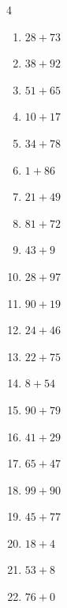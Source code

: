 \begin{multicols}{4}
\begin{enumerate}
  \item $28+73$
        \phantom{$=101$}

  \item $38+92$
        \phantom{$=130$}

  \item $51+65$
        \phantom{$=116$}

  \item $10+17$
        \phantom{$=27$}

  \item $34+78$
        \phantom{$=112$}

  \item $1+86$
        \phantom{$=87$}

  \item $21+49$
        \phantom{$=70$}

  \item $81+72$
        \phantom{$=153$}

  \item $43+9$
        \phantom{$=52$}

  \item $28+97$
        \phantom{$=125$}

  \item $90+19$
        \phantom{$=109$}

  \item $24+46$
        \phantom{$=70$}

  \item $22+75$
        \phantom{$=97$}

  \item $8+54$
        \phantom{$=62$}

  \item $90+79$
        \phantom{$=169$}

  \item $41+29$
        \phantom{$=70$}

  \item $65+47$
        \phantom{$=112$}

  \item $99+90$
        \phantom{$=189$}

  \item $45+77$
        \phantom{$=122$}

  \item $18+4$
        \phantom{$=22$}

  \item $53+8$
        \phantom{$=61$}

  \item $76+0$
        \phantom{$=76$}


\end{enumerate}
\end{multicols}
